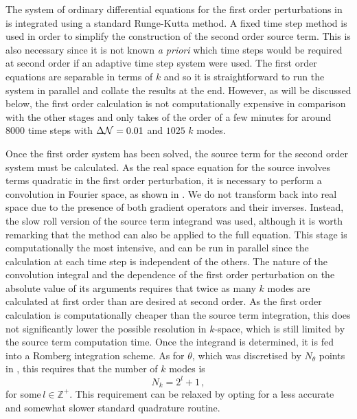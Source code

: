 The system of ordinary differential equations for the first order
perturbations in  is integrated using a standard
Runge-Kutta method. A fixed time step method is used in order to
simplify the construction of the  second order source term.
This is also necessary since it is not known \emph{a priori}
which time steps would be required at
second order if an adaptive time step system were used. The first
order equations are separable in terms of $k$ and so it is
straightforward to run the system in parallel and collate
the results at the end. However, as will be discussed below, the first
order calculation is not computationally expensive in comparison with
the other stages and only takes of the order of a few minutes for around
$8000$ time steps with $\Delta \mathcal{N}=0.01$ and $1025$ $k$ modes.


Once the first order system has been solved, 
the source term for the second order system must be calculated. As the
real space equation for the source involves terms quadratic in the
first order perturbation, it is necessary to perform a convolution in
Fourier space, as shown in .  We do not transform
back into real space due to the presence of both
gradient operators and their inverses. 
Instead, the slow roll version of
the source term integrand was used, although it is worth remarking that the method
can also be
applied to the full equation. This stage is computationally the most
intensive, and can be run in parallel since the calculation at each time step is
independent of the others. The nature of the convolution integral and the
dependence of the first order perturbation on the absolute value of
its arguments requires that twice as many $k$ modes are calculated at
first order than are desired at second order.  As
the first order calculation is computationally cheaper than the source
term integration, this does not significantly lower the possible
resolution in $k$-space, which is still limited by the source term
computation time.  Once the integrand is determined, it is fed into a
Romberg integration scheme. As for $\theta$,  which was
discretised by $N_\theta$ points in , this requires that the
number of $k$ modes is
%
\begin{equation}
\label{eq:nk-constraint-num}
N_k=2^l + 1\,,
\end{equation}
%
for some\footnotemark $\,l\in\mathbb{Z}^+$. 
This requirement can be relaxed by opting for a less
accurate and somewhat slower standard quadrature routine.



